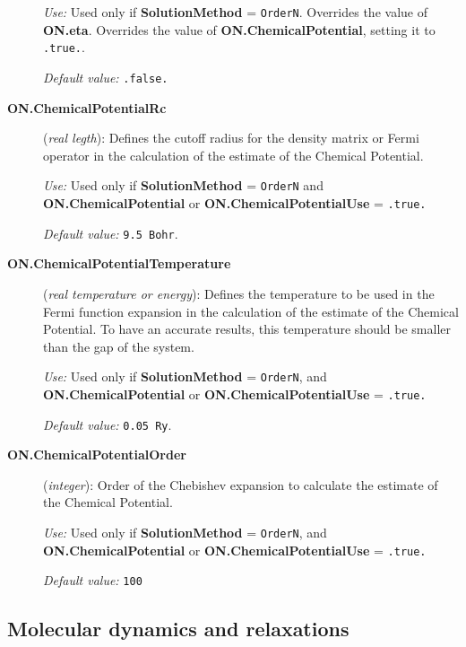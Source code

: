 \begin{description}
{\it Use:} Used only if {\bf SolutionMethod} = {\tt OrderN}.
Overrides the value of {\bf ON.eta}.
Overrides the value of {\bf ON.ChemicalPotential}, setting
it to {\tt .true.}.

{\it Default value:} {\tt .false.}

\item[{\bf ON.ChemicalPotentialRc}]  ({\it real legth}):
Defines the cutoff radius for the density matrix or Fermi
operator in the calculation of the estimate of the
Chemical Potential.

{\it Use:} Used only if {\bf SolutionMethod} = {\tt OrderN}
and {\bf ON.ChemicalPotential} or  {\bf ON.ChemicalPotentialUse} 
= {\tt .true.}

{\it Default value:} {\tt 9.5 Bohr}.

\item[{\bf ON.ChemicalPotentialTemperature}]  ({\it real temperature 
or energy}):
Defines the temperature to be used in the Fermi function expansion
in the calculation of the estimate of the Chemical Potential.
To have an accurate results, this temperature should be smaller 
than the gap of the system.

{\it Use:} Used only if {\bf SolutionMethod} = {\tt OrderN},
and {\bf ON.ChemicalPotential} or  {\bf ON.ChemicalPotentialUse} = 
{\tt .true.}

{\it Default value:} {\tt 0.05 Ry}.

\item[{\bf ON.ChemicalPotentialOrder}] ({\it integer}):
Order of the Chebishev expansion to calculate the estimate
of the Chemical Potential. 

{\it Use:} Used only if {\bf SolutionMethod} = {\tt OrderN},
and {\bf ON.ChemicalPotential} or  {\bf ON.ChemicalPotentialUse} = 
{\tt .true.}

{\it Default value:} {\tt 100}

\end{description}



\vspace{5pt}
\subsection{Molecular dynamics and relaxations}

